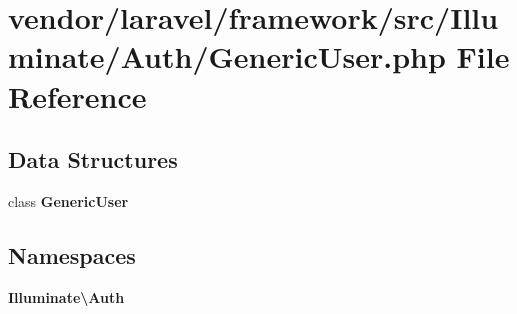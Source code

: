 \section{vendor/laravel/framework/src/\+Illuminate/\+Auth/\+Generic\+User.php File Reference}
\label{_generic_user_8php}
\subsection*{Data Structures}
\begin{DoxyCompactItemize}
\item 
class {\bf Generic\+User}
\end{DoxyCompactItemize}
\subsection*{Namespaces}
\begin{DoxyCompactItemize}
\item 
 {\bf Illuminate\textbackslash{}\+Auth}
\end{DoxyCompactItemize}
